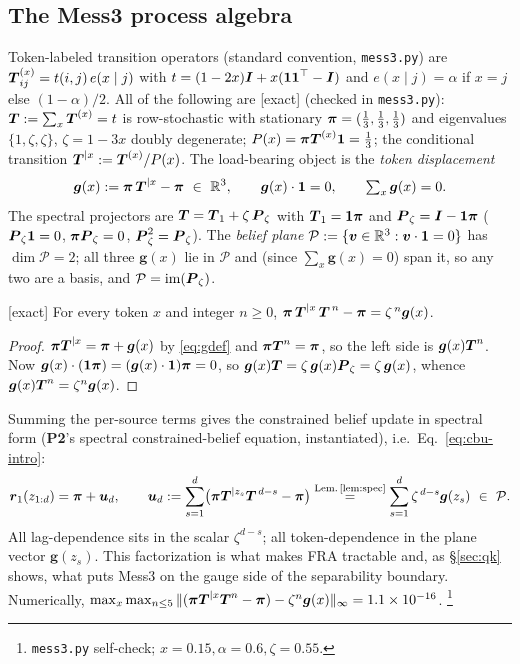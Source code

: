 \documentclass{article}
\newcommand{\gb}{\boldsymbol{g}}
\newcommand{\Pcal}{\mathcal{P}}
\newcommand{\Tcond}[1]{\Tb^{|#1}}
\newcommand{\htag}[1]{{\normalfont\sffamily\footnotesize[#1]}}
\newcommand{\Ptwo}{\textbf{P2}}
\begin{document}
\subsection{The Mess3 process algebra}\label{sec:mess3}

Token-labeled transition operators (standard convention, \texttt{mess3.py}) are
$\boldsymbol{T}^{(x)}_{ij}=t(i,j)\,e(x\mid j)$ with $t=(1-2x)\boldsymbol{I}+x(\boldsymbol{1}\boldsymbol{1}^\top-\boldsymbol{I})$ and
$e(x\mid j)=\alpha$ if $x=j$ else $(1-\alpha)/2$. All of the following are
\htag{exact} (checked in \texttt{mess3.py}): $\boldsymbol{T}:=\sum_x\boldsymbol{T}^{(x)}=t$ is row-stochastic
with stationary $\boldsymbol{\pi}=(\tfrac13,\tfrac13,\tfrac13)$ and eigenvalues
$\{1,\zeta,\zeta\}$, $\zeta=1-3x$ doubly degenerate; $P(x)=\boldsymbol{\pi}\boldsymbol{T}^{(x)}\boldsymbol{1}=\tfrac13$;
the conditional transition $\Tcond{x}:=\Tx/P(x)$. The load-bearing object is the
\emph{token displacement}
\begin{equation}\label{eq:gdef}
\gb(x):=\pib\,\Tcond{x}-\pib\ \in\ \mathbb{R}^3,\qquad
\gb(x)\cdot\one=0,\qquad \textstyle\sum_x\gb(x)=0.
\end{equation}
The spectral projectors are $\boldsymbol{T}=\boldsymbol{T}_1+\zeta\,\boldsymbol{P}_\zeta$ with $\boldsymbol{T}_1=\boldsymbol{1}\boldsymbol{\pi}$ and
$\boldsymbol{P}_\zeta=\boldsymbol{I}-\boldsymbol{1}\boldsymbol{\pi}$ ($\boldsymbol{P}_\zeta\boldsymbol{1}=0$, $\boldsymbol{\pi}\boldsymbol{P}_\zeta=0$,
$\boldsymbol{P}_\zeta^2=\boldsymbol{P}_\zeta$). The \emph{belief plane}
$\Pcal:=\{\vb\in\mathbb{R}^3:\vb\cdot\one=0\}$ has $\dim\Pcal=2$; all three $\gb(x)$
lie in $\Pcal$ and (since $\sum_x\gb(x)=0$) span it, so any two are a basis, and
$\Pcal=\mathrm{im}(\Pb_\zeta)$.

\begin{lemma}\label{lem:spec}
\htag{exact} For every token $x$ and integer $n\ge0$,
$\pib\,\Tcond{x}\,\Tb^{\,n}-\pib=\zeta^{\,n}\gb(x)$.
\end{lemma}
\begin{proof}
$\pib\Tcond{x}=\pib+\gb(x)$ by \eqref{eq:gdef} and $\boldsymbol{\pi}\boldsymbol{T}^n=\boldsymbol{\pi}$, so the left
side is $\gb(x)\Tb^n$. Now $\gb(x)\cdot(\one\pib)=(\gb(x)\cdot\one)\pib=0$, so
$\gb(x)\Tb=\zeta\,\gb(x)\Pb_\zeta=\zeta\,\gb(x)$, whence
$\gb(x)\Tb^n=\zeta^n\gb(x)$.
\end{proof}

Summing the per-source terms gives the constrained belief update in spectral form
(\Ptwo's spectral constrained-belief equation, instantiated), i.e.\
Eq.~\eqref{eq:cbu-intro}:
\begin{equation}\label{eq:cbu}
\rb_1(z_{1:d})=\pib+\ub_d,\qquad
\ub_d:=\sum_{s=1}^{d}\bigl(\pib\Tcond{z_s}\Tb^{\,d-s}-\pib\bigr)
\overset{\text{Lem.\,\ref{lem:spec}}}{=}\sum_{s=1}^{d}\zeta^{\,d-s}\gb(z_s)\ \in\ \Pcal.
\end{equation}
All lag-dependence sits in the scalar $\zeta^{d-s}$; all token-dependence in the
plane vector $\gb(z_s)$. This factorization is what makes FRA tractable and, as
\S\ref{sec:qk} shows, what puts Mess3 on the gauge side of the separability
boundary. Numerically,
$\max_x\max_{n\le5}\|(\pib\Tcond{x}\Tb^n-\pib)-\zeta^n\gb(x)\|_\infty=1.1\times10^{-16}$.%
\footnote{\texttt{mess3.py} self-check; $x=0.15,\alpha=0.6,\zeta=0.55$.}
\end{document}
